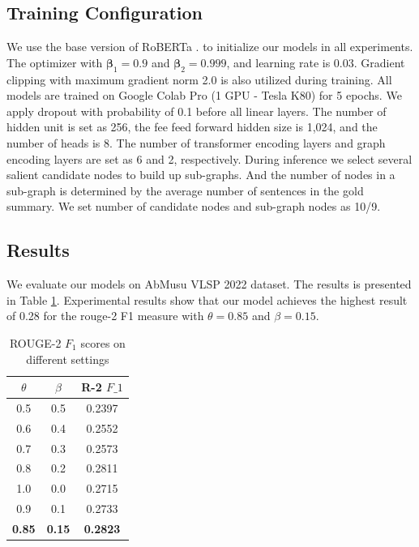 \documentclass[11pt]{article}
\begin{document}
\subsection{Training Configuration}
We use the base version of RoBERTa \cite{liu2019roberta}. to initialize our models in all experiments. The optimizer with $\mathbf{\beta}_{1}=0.9$ and $\mathbf{\beta}_{2}=0.999$, and learning rate is 0.03. Gradient clipping with maximum gradient norm 2.0 is also utilized during training. All models are trained on Google Colab Pro (1 GPU - Tesla K80) for 5 epochs. We apply dropout with probability of 0.1 before all linear layers. The number of hidden unit is set as 256, the fee feed forward hidden size is 1,024, and the number of heads is 8. The number of transformer encoding layers and graph encoding layers are set as 6 and 2, respectively. During inference we select several salient candidate nodes to build up sub-graphs. And the number of nodes in a sub-graph is determined by the average number of sentences in the gold summary. We set number of candidate nodes and sub-graph nodes as 10/9.
\subsection{Results}
We evaluate our models on AbMusu VLSP 2022 dataset. The results is presented in Table \ref{tab:results}.
Experimental results show that our model achieves the highest result of 0.28 for the rouge-2 F1 measure with $\theta=0.85$ and $\beta=0.15$.

\begin{table}[ht]
\centering
\caption{ROUGE-2 $F_1$ scores on different settings}
\label{tab:results}
\begin{tabular}{|c|c|c|}
\hline
\textbf{$\theta$} & \textbf{$\beta$} & \textbf{R-2 $F\_1$} \\ \hline
0.5            & 0.5           & 0.2397            \\
0.6            & 0.4           & 0.2552            \\
0.7            & 0.3           & 0.2573            \\
0.8            & 0.2           & 0.2811            \\
1.0            & 0.0           & 0.2715            \\
0.9            & 0.1           & 0.2733            \\
\textbf{0.85 }          & \textbf{0.15}          & \textbf{0.2823}            \\ \hline
\end{tabular}
\end{table}
\end{document}
